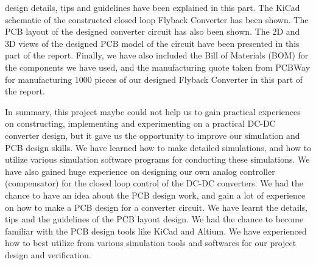 design details, tips and guidelines have been explained in this part. The KiCad schematic of the constructed closed loop Flyback Converter has been shown. The PCB layout of the designed converter circuit has also been shown. The 2D and 3D views of the designed PCB model of the circuit have been presented in this part of the report. Finally, we have also included the Bill of Materials (BOM) for the components we have used, and the manufacturing quote taken from PCBWay for manufacturing 1000 pieces of our designed Flyback Converter in this part of the report. 

In summary, this project maybe could not help us to gain practical experiences on constructing, implementing and experimenting on a practical DC-DC converter design, but it gave us the opportunity to improve our simulation and PCB design skills. We have learned how to make detailed simulations, and how to utilize various simulation software programs for conducting these simulations. We have also gained huge experience on designing our own analog controller (compensator) for the closed loop control of the DC-DC converters. We had the chance to have an idea about the PCB design work, and gain a lot of experience on how to make a PCB design for a converter circuit. We have learnt the details, tips and the guidelines of the PCB layout design. We had the chance to become familiar with the PCB design tools like KiCad and Altium. We have experienced how to best utilize from various simulation tools and softwares for our project design and verification.